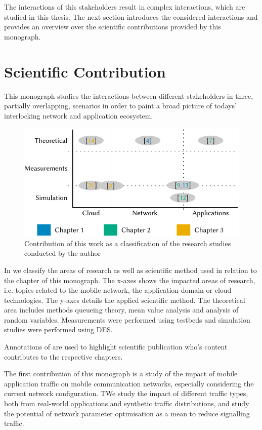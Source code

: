 The interactions of this stakeholders result in complex interactions, which are studied in this thesis.
The next section introduces the considered interactions and provides an overview over the scientific contributions provided by this monograph.

\section{Scientific Contribution}\label{sec:introduction:scientific_contribution}
This monograph studies the interactions between different stakeholders in three, partially overlapping, scenarios in order to paint a broad picture of todays' interlocking network and application ecosystem.

\begin{figure}
\centering
\includegraphics{figures/publications}
\caption{Contribution of this work as a classification of the research studies conducted by the author}\label{fig:introduction:publications}
\end{figure}

In  we classify the areas of research as well as scientific method used in relation to the chapter of this monograph.
The x-axes shows the impacted areas of research, i.e. topics related to the mobile network, the application domain or cloud technologies.
The y-axes details the applied scientific method.
The theoretical area includes methods queueing theory, mean value analysis and analysis of random variables.
Measurements were performed using testbeds and simulation studies were performed using \gls{DES}.

Annotations of are used to highlight scientific publication who's content contributes to the respective chapters.

The first contribution of this monograph is a study of the impact of mobile application traffic on mobile communication networks, especially considering the current network configuration.
TWe study the impact of different traffic types, both from real-world applications and synthetic traffic distributions, and study the potential of network parameter optimisation as a mean to reduce signalling traffic.


